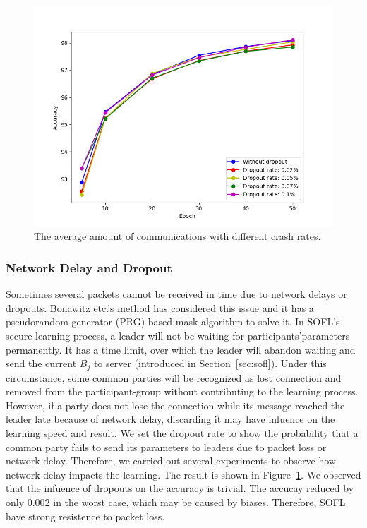 \begin{figure}[!ht]
    \centering
    \includegraphics[width=\columnwidth]{img/dropout-acc.png}
    \caption{The average amount of communications with different crash rates.}
    \label{dropout-acc}
\end{figure}

\subsubsection{Network Delay and Dropout}
Sometimes several packets cannot be received in time due to network delays or dropouts. Bonawitz etc.'s method\cite{Practical} has considered this issue and it has a pseudorandom generator (PRG) based mask algorithm to solve it. In SOFL's secure learning process, a leader will not be waiting for participants'parameters permanently. It has a time limit, over which the leader will abandon waiting and send the current $B_j$ to server (introduced in Section~\ref{sec:sofl}). Under this circumstance, some common parties will be recognized as lost connection and removed from the participant-group without contributing to the learning process. However, if a party does not lose the connection while its message reached the leader late because of network delay, discarding it may have infuence on the learning speed and result. We set the dropout rate to show the probability that a common party fails to send its parameters to leaders due to packet loss or network delay. Therefore, we carried out several experiments to observe how network delay impacts the learning. The result is shown in Figure~\ref{dropout-acc}. We observed that the infuence of dropouts on the accuracy is trivial. The accucay reduced by only 0.002 in the worst case, which may be caused by biases. Therefore, SOFL have strong resistence to packet loss. 


